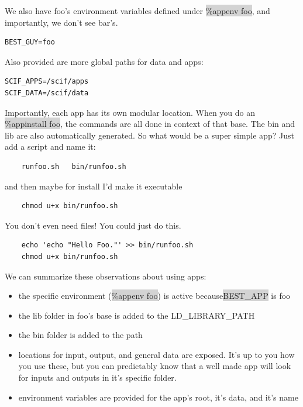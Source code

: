 \documentclass[a4paper]{article}
\begin{document}
		We also have foo’s environment variables defined under \colorbox{lightgray}{\%appenv foo}, and importantly, we don’t see bar’s.
\begin{lstlisting}[frame=single]  
BEST_GUY=foo
\end{lstlisting}		
		
Also provided are more global paths for data and apps:

\begin{lstlisting}[frame=single]  
SCIF_APPS=/scif/apps
SCIF_DATA=/scif/data
\end{lstlisting}

Importantly, each app has its own modular location. When you do an \colorbox{lightgray}{\%appinstall foo}, the commands are all done in context of that base. The bin and lib are also automatically generated. So what would be a super simple app? Just add a script and name it:\\[0.1in]
	
\begin{lstlisting}[frame=single]
%appfiles foo
    runfoo.sh   bin/runfoo.sh  
\end{lstlisting}
	
and then maybe for install I’d make it executable
	
\begin{lstlisting}[frame=single]  
%appinstall foo
    chmod u+x bin/runfoo.sh
\end{lstlisting}
	
   You don’t even need files! You could just do this.
\begin{lstlisting}[frame=single]  
%appinstall foo
    echo 'echo "Hello Foo."' >> bin/runfoo.sh
    chmod u+x bin/runfoo.sh
\end{lstlisting}
   
We can summarize these observations about using apps:

\begin{itemize}
\item the specific environment (\colorbox{lightgray}{\%appenv foo}) is active because\colorbox{lightgray}{BEST\_APP} is foo
\item the lib folder in foo’s base is added to the LD\_LIBRARY\_PATH
\item the bin folder is added to the path
\item locations for input, output, and general data are exposed. It’s up to you how you use these, but you can predictably know that a well made app will look for inputs and outputs in it’s specific folder.
\item environment variables are provided for the app’s root, it’s data, and it’s name

\end{itemize}
\end{document}

